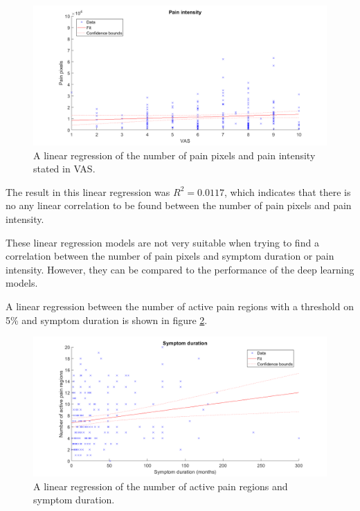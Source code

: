 \begin{figure} [H]
\centering
\includegraphics[width=1\textwidth]{figures/painRegression}
\caption{A linear regression of the number of pain pixels and pain intensity stated in VAS.}
\label{fig:painRegression}
\end{figure}

\noindent
The result in this linear regression was $R^2=0.0117$, which indicates that there is no any linear correlation to be found between the number of pain pixels and pain intensity.\newline

\noindent
These linear regression models are not very suitable when trying to find a correlation between the number of pain pixels and symptom duration or pain intensity. However, they can be compared to the performance of the deep learning models.




\noindent
A linear regression between the number of active pain regions with a threshold on 5\%  and symptom duration is shown in figure \ref{fig:regDuration}. \newline

\begin{figure} [H]
\centering
\includegraphics[width=1\textwidth]{figures/regionsRegressionDuration}
\caption{A linear regression of the number of active pain regions and symptom duration.}
\label{fig:regDuration}
\end{figure}


